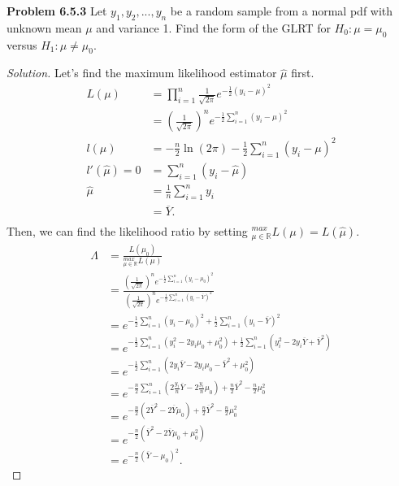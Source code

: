 \documentclass{article}
\begin{document}
\newpage
\textbf{Problem 6.5.3}
Let $y_1,y_2,...,y_n$ be a random sample from a normal pdf with unknown mean $\mu$ and variance 1. 
Find the form of the GLRT for $H_0 : \mu = \mu_0$ versus $H_1:\mu\neq\mu_0$.
\begin{proof}[Solution]
    Let's find the maximum likelihood estimator $\hat{\mu}$ first.
    \begin{align*}
        L(\mu) & = \prod_{i=1}^{n}\frac{1}{\sqrt{2\pi}}e^{-\frac{1}{2}(y_i-\mu)^2} \\
        & = \left(\frac{1}{\sqrt{2\pi}}\right)^n e^{-\frac{1}{2}\sum_{i=1}^{n}(y_i-\mu)^2} \\
        l(\mu) & = -\frac{n}{2}\ln(2\pi) - \frac{1}{2}\sum_{i=1}^{n}(y_i-\mu)^2 \\
        l'(\hat{\mu}) = 0 & = \sum_{i=1}^{n}(y_i-\hat{\mu}) \\
        \hat{\mu} & = \frac{1}{n}\sum_{i=1}^{n}y_i \\
        & = \overline{Y}. \\
    \end{align*}
    Then, we can find the likelihood ratio by setting $^{max}_{\mu\in\mathbb{R}}L(\mu) = L(\hat{\mu})$.
    \begin{align*}
        \Lambda & = \frac{L(\mu_0)}{^{max}_{\mu\in\mathbb{R}}L(\mu)} \\
        & = \frac{\left(\frac{1}{\sqrt{2\pi}}\right)^n e^{-\frac{1}{2}\sum_{i=1}^{n}(y_i-\mu_0)^2}}{\left(\frac{1}{\sqrt{2\pi}}\right)^n e^{-\frac{1}{2}\sum_{i=1}^{n}(y_i-\overline{Y})^2}} \\
        & = e^{-\frac{1}{2}\sum_{i=1}^{n}(y_i-\mu_0)^2 + \frac{1}{2}\sum_{i=1}^{n}(y_i-\overline{Y})^2} \\
        & = e^{-\frac{1}{2}\sum_{i=1}^{n}(y_i^2-2y_i\mu_0+\mu_0^2) + \frac{1}{2}\sum_{i=1}^{n}(y_i^2-2y_i\overline{Y}+\overline{Y}^2)} \\
        & = e^{-\frac{1}{2}\sum_{i=1}^{n}(2y_i\overline{Y}-2y_i\mu_0-\overline{Y}^2+\mu_0^2)} \\
        & = e^{-\frac{n}{2}\sum_{i=1}^{n}(2\frac{y_i}{n}\overline{Y}-2\frac{y_i}{n}\mu_0) + \frac{n}{2}\overline{Y}^2-\frac{n}{2}\mu_0^2} \\
        & = e^{-\frac{n}{2}\left(2\overline{Y}^2 - 2\overline{Y}\mu_0\right) + \frac{n}{2}\overline{Y}^2-\frac{n}{2}\mu_0^2} \\
        & = e^{-\frac{n}{2}\left(\overline{Y}^2 - 2\overline{Y}\mu_0 + \mu_0^2\right)} \\
        & = e^{-\frac{n}{2}\left(\overline{Y} - \mu_0\right)^2}. 

\end{align*}
\end{proof}
\end{document}
